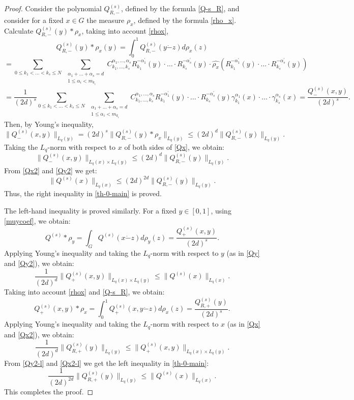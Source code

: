\documentclass[10pt,a4paper]{amsart}
\begin{document}
\begin{proof}
	Consider the polynomial $Q^{(s)}_{R, -}$, defined by the formula \eqref{Q-s_R}, and consider for a fixed $x\in G$ the measure $\rho_x$, defined by the formula \eqref{rho_x}. Calculate $Q^{(s)}_{R, -}(y)*\rho_x$, taking into account \eqref{rhox},
		\[
		Q^{(s)}_{R, -}(y) * \rho_x(y) = \int_0^1 Q^{(s)}_{R, -} (y\dot-z) d \rho_x(z) 
		\]
		\[
		=\sum_{0\le k_1 < \ldots < k_s \le N} \; \sum_{\substack{\alpha_1+\ldots+\alpha_s = d \\ 1 \le \alpha_i < m_{k_i}}} C_{k_1, \ldots, k_s}^{\alpha_1, \ldots, \alpha_s} R_{k_1}^{-\alpha^{\prime}_1}(y) \cdot \ldots \cdot R_{k_s}^{-\alpha^{\prime}_s}(y) \cdot \widehat{\rho_x}(R_{k_1}^{-\alpha^{\prime}_1}(y) \cdot \ldots \cdot R_{k_s}^{-\alpha^{\prime}_s}(y))
		\]
		\[
		= \frac{1}{(2d)^s} \sum_{0\le k_1 < \ldots < k_s \le N} \; \sum_{\substack{\alpha_1+\ldots+\alpha_s = d \\ 1 \le \alpha_i < m_{k_i}}} C_{k_1, \ldots, k_s}^{\alpha_1, \ldots, \alpha_s} R_{k_1}^{-\alpha^{\prime}_1}(y) \cdot \ldots \cdot R_{k_s}^{-\alpha^{\prime}_s}(y) \gamma_{k_1}^{\alpha_1}(x) \cdot \ldots \cdot \gamma_{k_s}^{\alpha_s}(x) = \frac{Q^{(s)}_{-}(x,y)}{(2d)^s}.
		\]
		Then, by Young's inequality, 
		\begin{equation} \label{Qx}
			\|Q^{(s)}_{-}(x,y)\|_{L_q(y)} = (2d)^{s}\|Q^{(s)}_{R,-}(y)* \rho_x\|_{L_q(y)} \le (2d)^{d}\|Q^{(s)}_{R,-}(y)\|_{L_q(y)}. 
		\end{equation}
		Taking the $L_q$-norm with respect to $x$ of both sides of \eqref{Qx}, we obtain:
		\begin{equation} \label{Qx2}
			\|Q^{(s)}_{-}(x,y)\|_{L_q(x)\times L_q(y)} \le (2d)^{d}\|Q^{(s)}_{R,-}(y)\|_{L_q(y)}.
		\end{equation}
		From \eqref{Qx2} and \eqref{Qy2} we get:
		\[
		\|Q^{(s)} (x)\|_{L_q(x)} \le (2d)^{2d} \|Q^{(s)}_{R,-}(y)\|_{L_q(y)}.
		\]
		Thus, the right inequality in \eqref{th-0-main} is proved.
		
        The left-hand inequality is proved similarly. For a fixed $y \in [0,1]$, using \eqref{muycoef}, we obtain:  
		\[
		Q^{(s)} * \rho_y = \int_{G} Q^{(s)} (x\dot-z) d\rho_y(z) = \frac{Q^{(s)}_{+}(x,y)}{(2d)^s}.
		\]
Applying Young's inequality and taking the $L_q$-norm with respect to $y$ (as in \eqref{Qy} and \eqref{Qy2}), we obtain:
		\begin{equation} \label{Qy2-l}
			\frac{1}{(2d)^d}\|Q^{(s)}_{+}(x,y)\|_{L_q(x)\times L_q(y)} \le \|Q^{(s)} (x)\|_{L_q(x)}.
		\end{equation}
		Taking into account \eqref{rhox} and \eqref{Q-s_R}, we obtain:
		\[
		Q^{(s)}_{+}(x,y) * \rho_x = \int_0^1 Q^{(s)}_{+} (x, y \dot-z)d\rho_x(z) = \frac{Q^{(s)}_{R, +}(y)}{(2d)^s}.
		\]
		Applying Young's inequality and taking the $L_q$-norm with respect to $x$ (as in \eqref{Qx} and \eqref{Qx2}), we obtain:
		\begin{equation} \label{Qx2-l}
			\frac{1}{(2d)^{d}} \|Q^{(s)}_{R,+}(y)\|_{L_q(y)}  \le  \|Q^{(s)}_{+}(x,y)\|_{L_q(x)\times L_q(y)}.
		\end{equation}
		From \eqref{Qy2-l} and \eqref{Qx2-l} we get the left inequality in \eqref{th-0-main}:
		\[
		\frac{1}{(2d)^{2d}} \|Q^{(s)}_{R,+}(y)\|_{L_q(y)} \le \|Q^{(s)} (x)\|_{L_q(x)}.
		\]	 
		This completes the proof.
	\end{proof}
\end{document}
